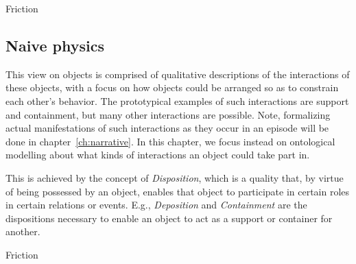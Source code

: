 \lipsum[2]

\begin{ODP}{Friction}
\end{ODP}

\subsection{Naive physics}

This view on objects is comprised of qualitative descriptions of the interactions of these objects, with a focus on how objects could be arranged so as to constrain each other's behavior. The prototypical examples of such interactions are support and containment, but many other interactions are possible. Note, formalizing actual manifestations of such interactions as they occur in an episode will be done in chapter~\ref{ch:narrative}. In this chapter, we focus instead on ontological modelling about what kinds of interactions an object could take part in.

This is achieved by the concept of \emph{Disposition}, which is a quality that, by virtue of being possessed by an object, enables that object to participate in certain roles in certain relations or events. E.g., \emph{Deposition} and \emph{Containment} are the dispositions necessary to enable an object to act as a support or container for another.

\begin{ODP}{Friction}
\end{ODP}



